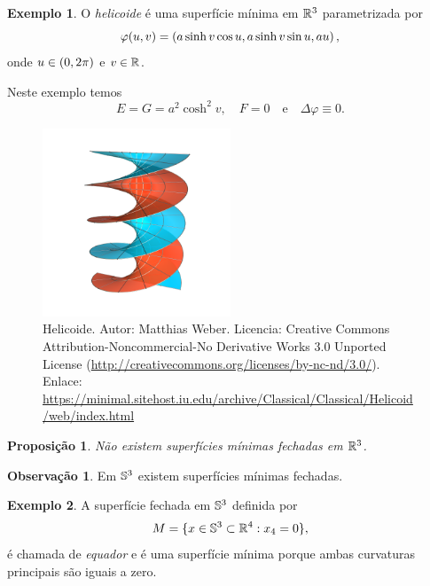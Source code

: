 \documentclass[12pt,a4paper]{beamer}
\newtheorem{proposicao}{Proposição}
\theoremstyle{definition}
\newtheorem{observacao}{Observação}
\newtheorem{exemplo}{Exemplo}
\begin{document}
\begin{frame}
	\begin{exemplo}
		O \emph{helicoide} é uma superfície mínima em $\mathbb R^3$ parametrizada por
		\begin{equation*}
			\varphi(u,v) = \left( a \sinh v \cos u, a \sinh v \sin u, au \right),
		\end{equation*}
		onde $u \in \left( 0, 2\pi \right)$ e $v \in \mathbb R$.
	\end{exemplo}
	Neste exemplo temos
	\begin{equation*}
		E = G = a^2 \cosh^2 v, \quad F = 0 \quad \text{e} \quad \Delta \varphi \equiv 0.
	\end{equation*}
\end{frame}

\begin{frame}
	\begin{figure}
		\centering
		\includegraphics[width=0.5\textwidth]{images/helicoid}
		\caption{Helicoide. Autor: Matthias Weber. Licencia: Creative Commons Attribution-Noncommercial-No Derivative Works 3.0 Unported License (\url{http://creativecommons.org/licenses/by-nc-nd/3.0/}). Enlace: \url{https://minimal.sitehost.iu.edu/archive/Classical/Classical/Helicoid/web/index.html}}
	\end{figure}
\end{frame}

\begin{frame}
	\begin{proposicao}
		Não existem superfícies mínimas fechadas em $\mathbb R^3$.
	\end{proposicao}

	\begin{observacao}
		Em $\mathbb{S}^3$ existem superfícies mínimas fechadas.
	\end{observacao}
\end{frame}


\begin{frame}
	\begin{exemplo}
		A superfície fechada em $\mathbb{S}^3$ definida por
		\begin{equation*}
			M = \{ x \in \mathbb{S}^3 \subset \mathbb R^4: x_4 = 0 \},
		\end{equation*}
		é chamada de \emph{equador} e é uma superfície mínima porque ambas curvaturas principais são iguais a zero.
	\end{exemplo}
\end{frame}
\end{document}
